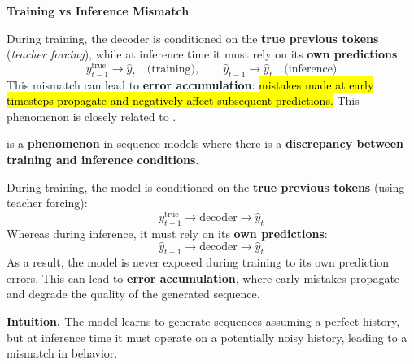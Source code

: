 \begin{flushleft}
    \textcolor{Red2}{ \textbf{Training vs Inference Mismatch}}
\end{flushleft}
During training, the decoder is conditioned on the \textbf{true previous tokens} (\emph{teacher forcing}), while at inference time it must rely on its \textbf{own predictions}:
\begin{equation*}
    y_{t-1}^{\text{true}} \rightarrow \hat{y}_t 
    \quad \text{(training)}, 
    \qquad
    \hat{y}_{t-1} \rightarrow \hat{y}_t 
    \quad \text{(inference)}
\end{equation*}
This mismatch can lead to \textbf{error accumulation}: \hl{mistakes made at early timesteps propagate and negatively affect subsequent predictions.} This phenomenon is closely related to .

\begin{definitionbox}
     is a \textbf{phenomenon} in sequence models where there is a \textbf{discrepancy between training and inference conditions}.

    \highspace
    During training, the model is conditioned on the \textbf{true previous tokens} (using teacher forcing):
    \begin{equation*}
        y_{t-1}^{\text{true}} \rightarrow \text{decoder} \rightarrow \hat{y}_t
    \end{equation*}
    Whereas during inference, it must rely on its \textbf{own predictions}:
    \begin{equation*}
        \hat{y}_{t-1} \rightarrow \text{decoder} \rightarrow \hat{y}_t
    \end{equation*}
    As a result, the model is never exposed during training to its own prediction errors. This can lead to \textbf{error accumulation}, where early mistakes propagate and degrade the quality of the generated sequence.

    \highspace
    \textcolor{Green3}{ \textbf{Intuition.}} The model learns to generate sequences assuming a perfect history, but at inference time it must operate on a potentially noisy history, leading to a mismatch in behavior.
\end{definitionbox}
